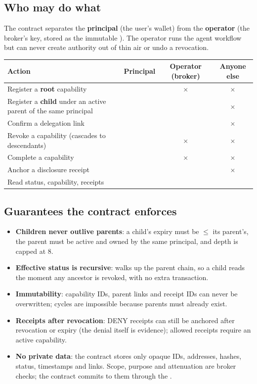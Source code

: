\documentclass[11pt,a4paper]{article}
\newcommand{\yes}{{\color{ok}\checkmark}}
\newcommand{\no}{{\color{deny}$\times$}}
\begin{document}
\subsection{Who may do what}
The contract separates the \textbf{principal} (the user's wallet) from the \textbf{operator} (the broker's key, stored as the immutable ). The operator runs the agent workflow but can never create authority out of thin air or undo a revocation.

\begin{center}
\renewcommand{\arraystretch}{1.35}
\begin{tabularx}{\textwidth}{@{}Y c c c@{}}
\toprule
\textbf{Action} & \textbf{Principal} & \textbf{Operator (broker)} & \textbf{Anyone else}\\
\midrule
Register a \textbf{root} capability & \yes & \no & \no\\
Register a \textbf{child} under an active parent of the same principal & \yes & \yes & \no\\
Confirm a delegation link & \yes & \yes & \no\\
Revoke a capability (cascades to descendants) & \yes & \no & \no\\
Complete a capability & \yes & \no & \no\\
Anchor a disclosure receipt & \yes & \yes & \no\\
Read status, capability, receipts & \yes & \yes & \yes\\
\bottomrule
\end{tabularx}
\end{center}

\subsection{Guarantees the contract enforces}
\begin{itemize}
  \item \textbf{Children never outlive parents}: a child's expiry must be $\leq$ its parent's, the parent must be active and owned by the same principal, and depth is capped at 8.
  \item \textbf{Effective status is recursive}:  walks up the parent chain, so a child reads  the moment any ancestor is revoked, with no extra transaction.
  \item \textbf{Immutability}: capability IDs, parent links and receipt IDs can never be overwritten; cycles are impossible because parents must already exist.
  \item \textbf{Receipts after revocation}: DENY receipts can still be anchored after revocation or expiry (the denial itself is evidence); allowed receipts require an active capability.
  \item \textbf{No private data}: the contract stores only opaque IDs, addresses, hashes, status, timestamps and links. Scope, purpose and attenuation are broker checks; the contract commits to them through the .
\end{itemize}
\end{document}
